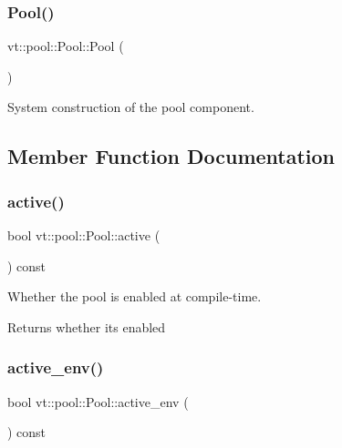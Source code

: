 \subsubsection{\texorpdfstring{Pool()}{Pool()}}
{\footnotesize\ttfamily vt\+::pool\+::\+Pool\+::\+Pool (\begin{DoxyParamCaption}{ }\end{DoxyParamCaption})}



System construction of the pool component. 



\subsection{Member Function Documentation}
\mbox{\label{structvt_1_1pool_1_1_pool_a3f34112821d767815d5049dc83503033}} 
\subsubsection{\texorpdfstring{active()}{active()}}
{\footnotesize\ttfamily bool vt\+::pool\+::\+Pool\+::active (\begin{DoxyParamCaption}{ }\end{DoxyParamCaption}) const}



Whether the pool is enabled at compile-\/time. 

\begin{DoxyReturn}{Returns}
whether its enabled 
\end{DoxyReturn}
\mbox{\label{structvt_1_1pool_1_1_pool_aa11bdd76d9f6491ac412d5abc5c63274}} 
\subsubsection{\texorpdfstring{active\+\_\+env()}{active\_env()}}
{\footnotesize\ttfamily bool vt\+::pool\+::\+Pool\+::active\+\_\+env (\begin{DoxyParamCaption}{ }\end{DoxyParamCaption}) const}



